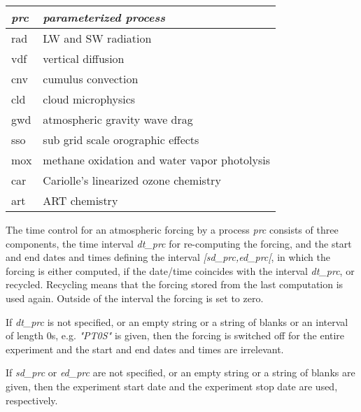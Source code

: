 \begin{table}[htbp]
\begin{center}
\begin{tabular}{l|l}
\textit{prc} & \textit{parameterized process} \\
\hline
rad & LW and SW radiation \\
vdf & vertical diffusion \\
cnv & cumulus convection \\
 cld & cloud microphysics \\
gwd & atmospheric gravity wave drag \\
sso & sub grid scale orographic effects \\
mox & methane oxidation and water vapor photolysis \\
car & Cariolle's linearized ozone chemistry \\
art & ART chemistry \\
\end{tabular}
\end{center}
\label{default}
\end{table}%

The time control for an atmospheric forcing by a process \textit{prc} consists of three components, the time interval \textit{dt\_prc} for re-computing the forcing, and the start and end dates and times defining the interval \textit{[sd\_prc,ed\_prc[}, in which the forcing is either computed, if the date/time coincides with the interval \textit{dt\_prc}, or recycled. Recycling means that the forcing stored from the last computation is used again. Outside of the interval the forcing is set to zero.

If \textit{dt\_prc} is not specified, or an empty string or a string of blanks or an interval of length 0s, e.g. \textit{"PT0S"} is given, then the forcing is switched off for the entire experiment and the start and end dates and times are irrelevant.

If \textit{sd\_prc} or \textit{ed\_prc} are not specified, or an empty string or a string of blanks are given, then the experiment start date and the experiment stop date are used, respectively.

